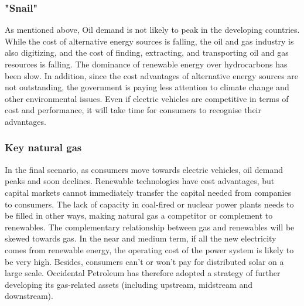 \documentclass[
	a4paper, %
	12pt,%
]{CSSullivanBusinessReport}
\begin{document}
\begin{fullwidth}
\subsubsection{"Snail"}
As mentioned above, Oil demand is not likely to peak in the developing countries. While the cost of alternative energy sources is falling, the oil and gas industry is also digitizing, and the cost of finding, extracting, and transporting oil and gas resources is falling. The dominance of renewable energy over hydrocarbons has been slow. In addition, since the cost advantages of alternative energy sources are not outstanding, the government is paying less attention to climate change and other environmental issues. Even if electric vehicles are competitive in terms of cost and performance, it will take time for consumers to recognise their advantages. 

\subsubsection{Key natural gas}
In the final scenario, as consumers move towards electric vehicles, oil demand peaks and soon declines. Renewable technologies have cost advantages, but capital markets cannot immediately transfer the capital needed from companies to consumers. The lack of capacity in coal-fired or nuclear power plants needs to be filled in other ways, making natural gas a competitor or complement to renewables. The complementary relationship between gas and renewables will be skewed towards gas. In the near and medium term, if all the new electricity comes from renewable energy, the operating cost of the power system is likely to be very high. Besides, consumers can't or won't pay for distributed solar on a large scale. Occidental Petroleum has therefore adopted a strategy of further developing its gas-related assets (including upstream, midstream and downstream).


\end{fullwidth}
\end{document}
